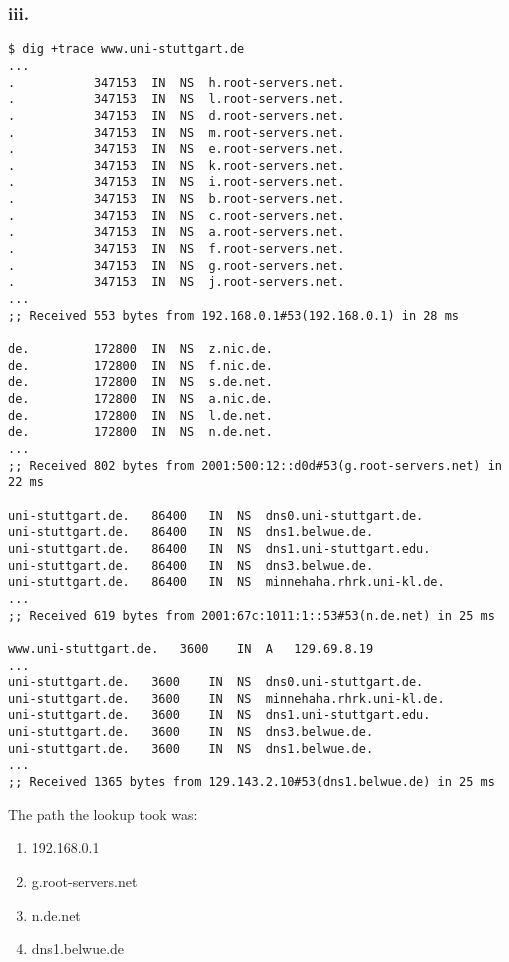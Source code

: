 \documentclass{scrartcl}
\begin{document}
\subsubsection*{iii.}
\begin{lstlisting}
$ dig +trace www.uni-stuttgart.de
...
.			347153	IN	NS	h.root-servers.net.
.			347153	IN	NS	l.root-servers.net.
.			347153	IN	NS	d.root-servers.net.
.			347153	IN	NS	m.root-servers.net.
.			347153	IN	NS	e.root-servers.net.
.			347153	IN	NS	k.root-servers.net.
.			347153	IN	NS	i.root-servers.net.
.			347153	IN	NS	b.root-servers.net.
.			347153	IN	NS	c.root-servers.net.
.			347153	IN	NS	a.root-servers.net.
.			347153	IN	NS	f.root-servers.net.
.			347153	IN	NS	g.root-servers.net.
.			347153	IN	NS	j.root-servers.net.
...
;; Received 553 bytes from 192.168.0.1#53(192.168.0.1) in 28 ms

de.			172800	IN	NS	z.nic.de.
de.			172800	IN	NS	f.nic.de.
de.			172800	IN	NS	s.de.net.
de.			172800	IN	NS	a.nic.de.
de.			172800	IN	NS	l.de.net.
de.			172800	IN	NS	n.de.net.
...
;; Received 802 bytes from 2001:500:12::d0d#53(g.root-servers.net) in 22 ms

uni-stuttgart.de.	86400	IN	NS	dns0.uni-stuttgart.de.
uni-stuttgart.de.	86400	IN	NS	dns1.belwue.de.
uni-stuttgart.de.	86400	IN	NS	dns1.uni-stuttgart.edu.
uni-stuttgart.de.	86400	IN	NS	dns3.belwue.de.
uni-stuttgart.de.	86400	IN	NS	minnehaha.rhrk.uni-kl.de.
...
;; Received 619 bytes from 2001:67c:1011:1::53#53(n.de.net) in 25 ms

www.uni-stuttgart.de.	3600	IN	A	129.69.8.19
...
uni-stuttgart.de.	3600	IN	NS	dns0.uni-stuttgart.de.
uni-stuttgart.de.	3600	IN	NS	minnehaha.rhrk.uni-kl.de.
uni-stuttgart.de.	3600	IN	NS	dns1.uni-stuttgart.edu.
uni-stuttgart.de.	3600	IN	NS	dns3.belwue.de.
uni-stuttgart.de.	3600	IN	NS	dns1.belwue.de.
...
;; Received 1365 bytes from 129.143.2.10#53(dns1.belwue.de) in 25 ms

\end{lstlisting}
The path the lookup took was:
\begin{enumerate}
	\item 192.168.0.1
	\item g.root-servers.net
	\item n.de.net
	\item dns1.belwue.de
\end{enumerate}
\end{document}
